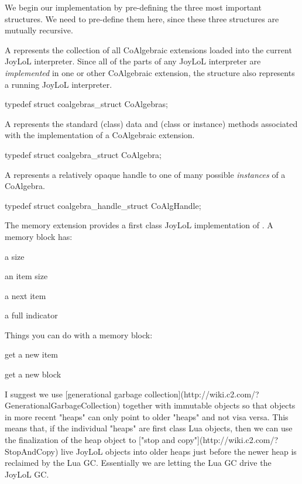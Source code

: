 We begin our implementation by pre-defining the three most important 
structures. We need to pre-define them here, since these three structures 
are mutually recursive. 

\startitemize

\item A  represents the collection of all CoAlgebraic 
extensions loaded into the current JoyLoL interpreter. Since all of the 
parts of any JoyLoL interpreter are \emph{implemented} in one or other 
CoAlgebraic extension, the  structure also represents a 
running JoyLoL interpreter. 

\startCHeader 
typedef struct coalgebras_struct CoAlgebras;
\stopCHeader 

\item A  represents the standard (class) data and (class 
or instance) methods associated with the implementation of a CoAlgebraic 
extension. 

\startCHeader
typedef struct coalgebra_struct CoAlgebra;
\stopCHeader

\item A  represents a relatively opaque handle to one of 
many possible \emph{instances} of a CoAlgebra. 

\startCHeader
typedef struct coalgebra_handle_struct CoAlgHandle;
\stopCHeader 
\stopitemize

The memory extension provides a first class JoyLoL implementation of 
. A memory block has:

\startitemize

\item a size

\item an item size

\item a next item

\item a full indicator

\stopitemize

Things you can do with a memory block:

\startitemize

\item get a new item

\item get a new block

\stopitemize


I suggest we use [generational garbage 
collection](http://wiki.c2.com/?GenerationalGarbageCollection) together 
with immutable objects so that objects in more recent "heaps" can only 
point to older "heaps" and not visa versa. This means that, if the 
individual "heaps" are first class Lua objects, then we can use the 
finalization of the heap object to ["stop and 
copy"](http://wiki.c2.com/?StopAndCopy) live JoyLoL objects into older 
heaps just before the newer heap is reclaimed by the Lua GC. Essentially 
we are letting the Lua GC drive the JoyLoL GC. 





